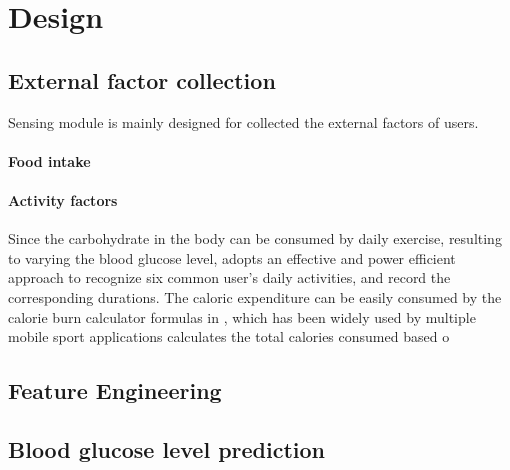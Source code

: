 
\section{Design}
\label{sec:design}

\subsection{External factor collection}
Sensing module is mainly designed for collected the external factors of users.

\paragraph{Food intake}

\paragraph{Activity factors}
Since the carbohydrate in the body can be consumed by daily exercise, resulting to varying the blood glucose level, \sysname adopts an effective and power efficient approach \cite{bib:kwapisz2011activity} to recognize six common user's daily activities, and record the corresponding durations. The caloric expenditure can be easily consumed by the calorie burn calculator formulas in \cite{bib:zhan2012accurate}, which has been widely used by multiple mobile sport applications \cite{}
calculates the total calories consumed based o




\subsection{Feature Engineering}


\subsection{Blood glucose level prediction}

